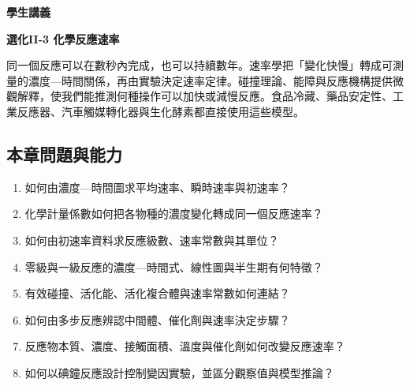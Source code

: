 \documentclass[11pt,a4paper]{article}
\providecommand{\tightlist}{%
  \setlength{\itemsep}{0pt}\setlength{\parskip}{0pt}}
\begin{document}
\begin{tcolorbox}[
  enhanced,colback=white,colframe=HandoutBlue,boxrule=1.1pt,arc=2mm,
  borderline west={3pt}{0pt}{HandoutBlue},left=5mm,right=4mm,top=4mm,bottom=4mm
]
{\sffamily\small\bfseries\color{HandoutBlue}學生講義}\par
{\sffamily\bfseries\LARGE\color{HandoutInk}選化II-3 化學反應速率}\par
\vspace{0.35em}{\large 由濃度---時間資料建立速率定律，再用碰撞、能障與反應機構解釋濃度、溫度、接觸面積與催化劑的影響}\par
{}\par
{}\par
\end{tcolorbox}


同一個反應可以在數秒內完成，也可以持續數年。速率學把「變化快慢」轉成可測量的濃度---時間關係，再由實驗決定速率定律。碰撞理論、能障與反應機構提供微觀解釋，使我們能推測何種操作可以加快或減慢反應。食品冷藏、藥品安定性、工業反應器、汽車觸媒轉化器與生化酵素都直接使用這些模型。

\begin{HandoutLearningMap}

\subsection{本章問題與能力}\label{ux672cux7ae0ux554fux984cux8207ux80fdux529b}

\begin{enumerate}
\def\labelenumi{\arabic{enumi}.}
\tightlist
\item
  如何由濃度---時間圖求平均速率、瞬時速率與初速率？
\item
  化學計量係數如何把各物種的濃度變化轉成同一個反應速率？
\item
  如何由初速率資料求反應級數、速率常數與其單位？
\item
  零級與一級反應的濃度---時間式、線性圖與半生期有何特徵？
\item
  有效碰撞、活化能、活化複合體與速率常數如何連結？
\item
  如何由多步反應辨認中間體、催化劑與速率決定步驟？
\item
  反應物本質、濃度、接觸面積、溫度與催化劑如何改變反應速率？
\item
  如何以碘鐘反應設計控制變因實驗，並區分觀察值與模型推論？
\end{enumerate}

\end{HandoutLearningMap}
\end{document}
